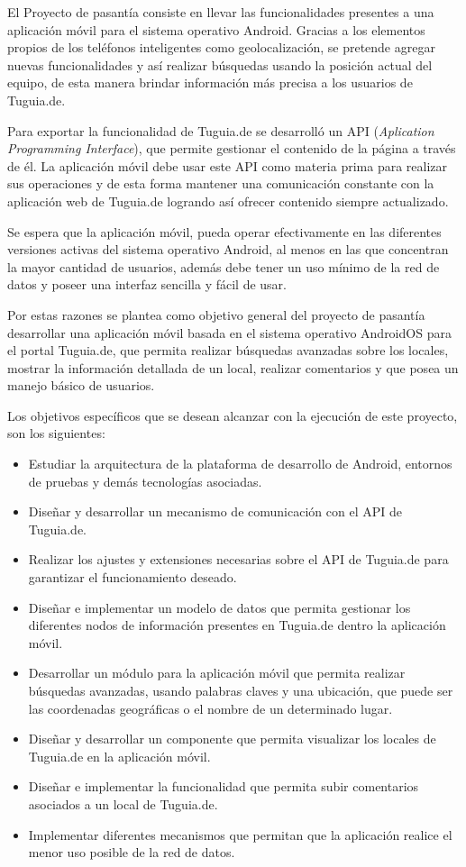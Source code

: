 El Proyecto de pasantía consiste en llevar las funcionalidades presentes a una aplicación móvil para el sistema operativo Android. Gracias a los elementos propios de los teléfonos inteligentes como geolocalización, se pretende agregar nuevas funcionalidades y así realizar búsquedas usando la posición actual del equipo, de esta manera brindar información más precisa a los usuarios de Tuguia.de.

Para exportar la funcionalidad de Tuguia.de se desarrolló un API (\textit{Aplication Programming Interface}), que permite gestionar el contenido de la página a través de él. La aplicación móvil debe usar este API como materia prima para realizar sus operaciones y de esta forma mantener una comunicación constante con la aplicación web de Tuguia.de logrando así ofrecer contenido siempre actualizado.

Se espera que la aplicación móvil, pueda operar efectivamente en las diferentes versiones activas del sistema operativo Android, al menos en las que concentran la mayor cantidad de usuarios, además debe tener un uso mínimo de la red de datos y poseer una interfaz sencilla y fácil de usar.

Por estas razones se plantea como objetivo general del proyecto de pasantía desarrollar una aplicación móvil basada en el sistema operativo AndroidOS para el portal Tuguia.de, que permita realizar búsquedas avanzadas sobre los locales, mostrar la información detallada de un local, realizar comentarios y que posea un manejo básico de usuarios.

Los objetivos específicos que se desean alcanzar con la ejecución de este proyecto, son los siguientes:

 \begin{itemize}
\item Estudiar la arquitectura de la plataforma de desarrollo de Android, entornos de pruebas y demás tecnologías asociadas.
\item Diseñar y desarrollar un mecanismo de comunicación con el API de Tuguia.de.
\item Realizar los ajustes y extensiones necesarias sobre el API de Tuguia.de para garantizar el funcionamiento deseado.
\item Diseñar e implementar un modelo de datos que permita gestionar los diferentes nodos de información presentes en Tuguia.de dentro la aplicación móvil. 
\item Desarrollar un módulo para la aplicación móvil que permita realizar búsquedas avanzadas, usando palabras claves y una ubicación, que puede ser las coordenadas geográficas o el nombre de un determinado lugar.
\item Diseñar y desarrollar un componente que permita visualizar los locales de Tuguia.de en la aplicación móvil.  
\item Diseñar e implementar la funcionalidad que permita subir comentarios asociados a un local de Tuguia.de.
\item Implementar diferentes mecanismos que permitan que la aplicación realice el menor uso posible de la red de datos.

\end{itemize}

